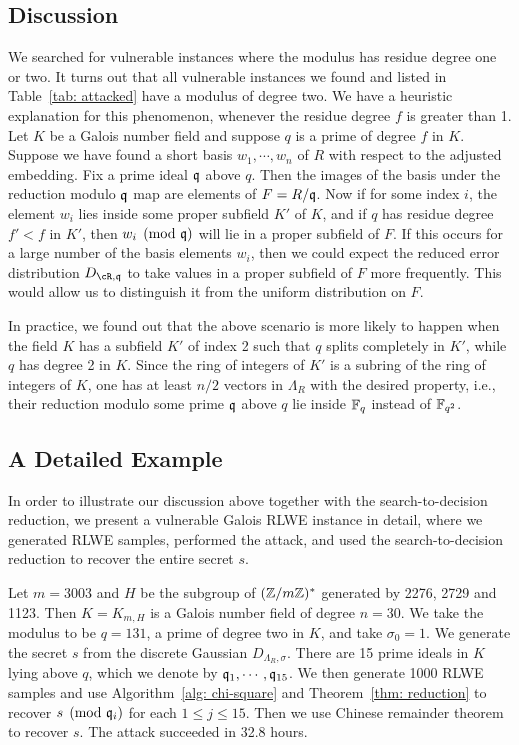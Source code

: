 \documentclass[envcountsame]{llncs}
\begin{document}
\subsection{Discussion}

We searched for vulnerable instances where the modulus has residue degree one or two. It turns out that all vulnerable instances we found and listed in Table~\ref{tab: attacked} have a modulus of degree two.  We have a heuristic explanation for this phenomenon, whenever the residue degree $f$ is greater than 1.  Let $K$  be a Galois number field and suppose $q$ is a prime of degree $f$ in $K$. Suppose we have found a short basis $w_1,\cdots, w_n$ of $R$ with respect to the adjusted embedding. Fix a prime ideal $\mathfrak{q}$ above $q$. Then the images of the basis under the reduction modulo $\mathfrak{q}$ map are elements of $F = R/\mathfrak{q}$. Now if for some index $i$, the element $w_i$ lies inside some proper subfield $K'$ of $K$, and if $q$ has residue degree $f' < f$ in $K'$, then $w_i \pmod{\mathfrak{q}}$ will lie in a proper subfield of $F$. If this occurs for a large number of the basis elements $w_i$, then we could  expect the reduced error distribution $D_{\cR,\fq}$ to take values in a proper subfield of $F$ more frequently. This would allow us to distinguish it from the uniform distribution on $F$.

In practice, we found out that the above scenario is more likely to happen when the field $K$ has a subfield $K'$ of index 2 such that $q$ splits completely in $K'$, while $q$ has degree 2 in $K$. Since the ring of integers of $K'$ is a subring of the ring of integers of $K$, one has at least $n/2$ vectors in $\Lambda_R$ with the desired property, i.e., their reduction modulo some prime $\mathfrak{q}$ above $q$ lie inside $\mathbb{F}_q$ instead of $\mathbb{F}_{q^2}$.



\subsection{A Detailed Example} \label{subsec: detailed}
In order to illustrate our discussion above together with the search-to-decision reduction, we present a vulnerable Galois RLWE instance in detail, where we generated RLWE samples, performed the attack, and used the search-to-decision reduction to recover the entire secret $s$.


Let $m = 3003$ and $H$ be the subgroup of $(\mathbb{Z}/m\mathbb{Z})^*$ generated by 2276, 2729 and 1123. Then $K = K_{m,H}$ is a Galois number field of degree $n = 30$. We take the modulus to be $q = 131$, a prime of degree two in $K$, and take $\sigma_0 = 1$. We generate the secret $s$ from the discrete Gaussian $D_{\Lambda_R, \sigma}$.  There are 15 prime ideals in $K$ lying above $q$, which we denote by $\mathfrak{q}_1, \cdots, \mathfrak{q}_{15}$. We then generate 1000 RLWE samples and use Algorithm~\ref{alg: chi-square} and Theorem~\ref{thm: reduction} to recover $s \pmod {\mathfrak{q}_i}$ for each $1 \leq j \leq 15$. Then we use Chinese remainder theorem to recover $s$. The attack succeeded in 32.8 hours.
\end{document}
